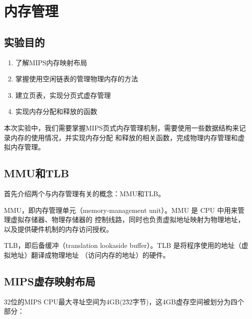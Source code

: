 \chapter{内存管理}

\section{实验目的}
  \begin{enumerate}
    \item 了解MIPS内存映射布局
    \item 掌握使用空闲链表的管理物理内存的方法
    \item 建立页表，实现分页式虚存管理
    \item 实现内存分配和释放的函数
  \end{enumerate}

本次实验中，我们需要掌握MIPS页式内存管理机制，需要使用一些数据结构来记录内存的使用情况，并实现内存分配
和释放的相关函数，完成物理内存管理和虚拟内存管理。

\section{MMU和TLB}

首先介绍两个与内存管理有关的概念：MMU和TLB。

\begin{note}
MMU，即内存管理单元（memory‐management unit）。MMU 是 CPU 中用来管理虚拟存储器、物理存储器的
控制线路，同时也负责虚拟地址映射为物理地址，以及提供硬件机制的内存访问授权。
\end{note}

\begin{note}
TLB，即后备缓冲（translation lookaside buffer）。TLB 是将程序使用的地址（虚拟地址）翻译成物理地址
（访问内存的地址）的硬件。
\end{note}

\section{MIPS虚存映射布局}

32位的MIPS CPU最大寻址空间为4GB(2\^32字节)，这4GB虚存空间被划分为四个部分：

